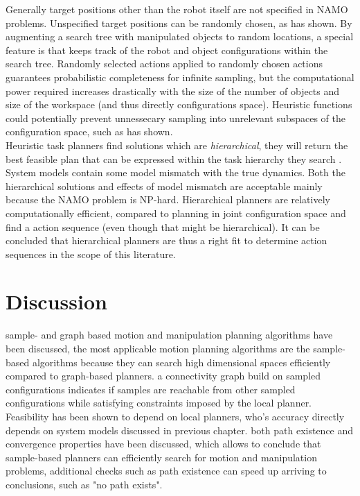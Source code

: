 Generally target positions other than the robot itself are not specified in \ac{NAMO} problems. Unspecified target positions can be randomly chosen, as \cite{siciliano_path_2009} has shown. By augmenting a search tree with manipulated objects to random locations, a special feature is that \cite{siciliano_path_2009} keeps track of the robot and object configurations within the search tree. Randomly selected actions applied to randomly chosen actions guarantees probabilistic completeness for infinite sampling, but the computational power required increases drastically with the size of the number of objects and size of the workspace (and thus directly configurations space). Heuristic functions could potentially prevent unnessecary sampling into unrelevant subspaces of the configuration space, such as \cite{sabbagh_novin_model_2021} has shown.\\

Heuristic task planners find solutions which are \textit{hierarchical}, they will return the best feasible plan that can be expressed within the task hierarchy they search \cite{goldberg_asymptotically_2020}. System models contain some model mismatch with the true dynamics. Both the hierarchical solutions and effects of model mismatch are acceptable mainly because the \ac{NAMO} problem is NP-hard. Hierarchical planners are relatively computationally efficient, compared to planning in joint configuration space and find a action sequence (even though that might be hierarchical). It can be concluded that hierarchical planners are thus a right fit to determine action sequences in the scope of this literature. \\

\section{Discussion}
\label{section: tamp_discussion}
sample- and graph based motion and manipulation planning algorithms have been discussed, the most applicable motion planning algorithms are the sample-based algorithms because they can search high dimensional spaces efficiently compared to graph-based planners. a connectivity graph build on sampled configurations indicates if samples are reachable from other sampled configurations while satisfying constraints imposed by the local planner. Feasibility has been shown to depend on local planners, who's accuracy directly depends on system models discussed in previous chapter. both path existence and convergence properties have been discussed, which allows to conclude that sample-based planners can efficiently search for motion and manipulation problems, additional checks such as path existence can speed up arriving to conclusions, such as "no path exists". \\

